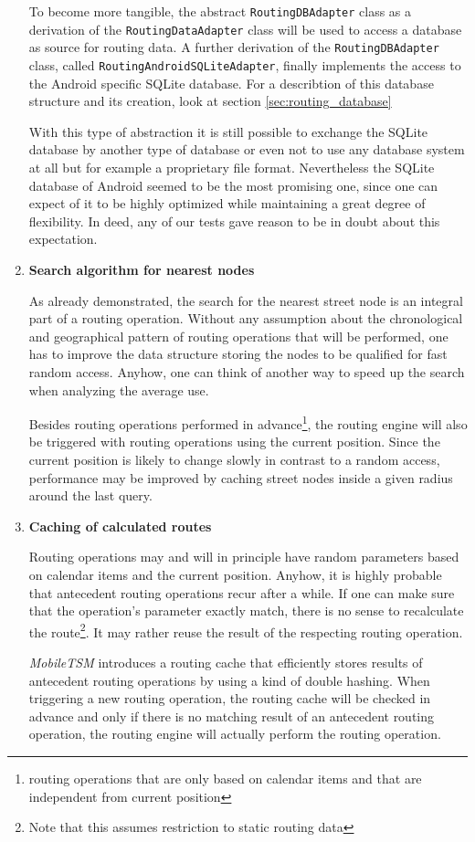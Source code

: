 \begin{enumerate}
To become more tangible, the abstract \texttt{RoutingDBAdapter} class as a derivation of the \texttt{RoutingDataAdapter} class will be used to access a database as source for routing data. A further derivation of the \texttt{RoutingDBAdapter} class, called \texttt{RoutingAndroidSQLiteAdapter}, finally implements the access to the Android specific SQLite database. For a describtion of this database structure and its creation, look at section \ref{sec:routing_database}\newline

With this type of abstraction it is still possible to exchange the SQLite database by another type of database or even not to use any database system at all but for example a proprietary file format. Nevertheless the SQLite database of Android seemed to be the most promising one, since one can expect of it to be highly optimized while maintaining a great degree of flexibility. In deed, any of our tests gave reason to be in doubt about this expectation.

	\item \textbf{Search algorithm for nearest nodes}

As already demonstrated, the search for the nearest street node is an integral part of a routing operation. Without any assumption about the chronological and geographical pattern of routing operations that will be performed, one has to improve the data structure storing the nodes to be qualified for fast random access. Anyhow, one can think of another way to speed up the search when analyzing the average use.\newline

Besides routing operations performed in advance\footnote{routing operations that are only based on calendar items and that are independent from current position}, the routing engine will also be triggered with routing operations using the current position. Since the current position is likely to change slowly in contrast to a random access, performance may be improved by caching street nodes inside a given radius around the last query.


	\item \textbf{Caching of calculated routes}
	
		Routing operations may and will in principle have random parameters based on calendar items and the current position. Anyhow, it is highly probable that antecedent routing operations recur after a while. If one can make sure that the operation's parameter exactly match, there is no sense to recalculate the route\footnote{Note that this assumes restriction to static routing data}. It may rather reuse the result of the respecting routing operation.\newline
		
		\emph{MobileTSM} introduces a routing cache that efficiently stores results of antecedent routing operations by using a kind of double hashing. When triggering a new routing operation, the routing cache will be checked in advance and only if there is no matching result of an antecedent routing operation, the routing engine will actually perform the routing operation.


\end{enumerate}

